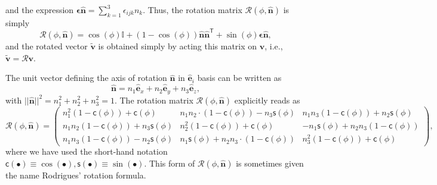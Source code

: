 \documentclass{article}
\def\nh{\hat{\mathbf{n}}}
\def\eh{\hat{\mathbf{e}}}
\def\v{\mathbf{v}}
\def\vt{\tilde{\mathbf{v}}}
\def\R{\mathcal{R}}
\def\I{\mathbb{I}}
\def\T{\mathsf{T}}
\def\c{\textsf{c}}
\def\s{\textsf{s}}
\def\nh{\hat{\mathbf{n}}}
\begin{document}
and the expression $\bm{\epsilon} \nh = \sum_{k=1}^3 \epsilon_{ijk}n_k$. Thus, the rotation matrix $\R(\phi, \nh)$ is simply
\begin{equation}
\R(\phi, \nh) = \cos(\phi)\I + (1 - \cos(\phi)) \nh \nh^\T + \sin(\phi) \bm{\epsilon} \nh,
\end{equation}
and the rotated vector $\vt$ is obtained simply by acting this matrix on $\v$, i.e., $\vt = \R \v$.

\noindent The unit vector defining the axis of rotation $\hat{\mathbf{n}}$ in $\eh_i$ basis can be written as
\begin{equation}
    \nh = n_1 \eh_x + n_2 \eh_y + n_3 \eh_z,
\end{equation}
with $||\nh||^2 = n_1^2 + n_2^2 + n_3^2 = 1$. The rotation matrix \(\R(\phi, \nh)\) explicitly reads as
\begin{equation}\label{eq:rodgForm}
\R(\phi, \nh) = \begin{pmatrix}
    n_1^2 (1 - \c(\phi)) + \c(\phi) & n_1 n_2 \cdot (1 - \c(\phi)) - n_3 \s(\phi) & n_1 n_3 (1 - \c(\phi)) + n_2 \s(\phi) \\
    n_1 n_2 (1 - \c(\phi)) + n_3 \s(\phi) & n_2^2 (1 - \c(\phi)) + \c(\phi) & - n_1 \s(\phi) + n_2 n_3 (1 - \c(\phi)) \\
    n_1 n_3 (1 - \c(\phi)) - n_2 \s(\phi) & n_1 \s(\phi) + n_2  n_3 \cdot (1 - \c(\phi)) & n_3^2 (1 - \c(\phi)) + \c(\phi)
\end{pmatrix},
\end{equation}
where we have used the short-hand notation $\c(\bullet) \equiv \cos(\bullet), \s(\bullet) \equiv \sin(\bullet)$. This form of $\R(\phi, \nh)$ is sometimes given the name Rodrigues' rotation formula.
\end{document}
